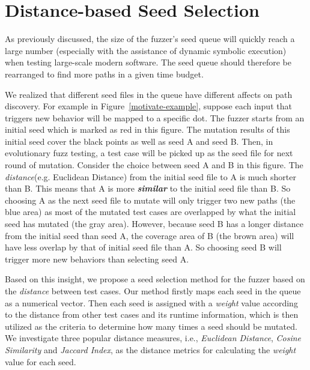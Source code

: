 \documentclass{cta-author}
\begin{document}
\section{Distance-based Seed Selection} \label{sec:seed selection}
As previously discussed, the size of the fuzzer's seed queue will quickly 
reach a large number (especially with the assistance of dynamic symbolic 
execution) when testing large-scale modern software. The seed queue should 
therefore be rearranged to find more paths in a given time budget.

We realized that different seed files in the queue have different affects 
on path discovery. For example in Figure~\ref{motivate-example}, suppose 
each input that triggers new behavior will be mapped to a specific dot. 
The fuzzer starts from an initial seed which is marked as red in this figure. 
The mutation results of this initial seed cover the black points 
as well as seed A and seed B. Then, in evolutionary fuzz testing, a 
test case will be picked up as the seed file for next round of mutation. 
Consider the choice between seed A and B in this figure.
The \emph{distance}(e.g. Euclidean Distance) from the initial seed file 
to A is much shorter than B. 
This means that A is more \textbf{\textit{similar}} to the initial seed 
file than B. So choosing A as the next seed file to mutate will only 
trigger two new paths (the blue area) as most of the mutated test cases 
are overlapped by what the initial seed has mutated (the gray area). 
However, because seed B has a longer distance from the initial seed than 
seed A, the coverage area of B (the brown area) will have less overlap 
by that of initial seed file than A. So choosing seed B will trigger 
more new behaviors than selecting seed A.

Based on this insight, we propose a seed selection method for the fuzzer 
based on the \textit{distance} between test cases.
Our method firstly maps each seed in the queue as a numerical vector. 
Then each seed is assigned with a \emph{weight} value according to the 
distance from other test cases and its runtime information, which is 
then utilized as the criteria to determine how many times a seed should
be mutated. 
We investigate three popular distance measures, i.e., \textit{Euclidean Distance}, 
\textit{Cosine Similarity} and \textit{Jaccard Index}, as the distance metrics 
for calculating the \textit{weight} value for each seed. 
\end{document}
